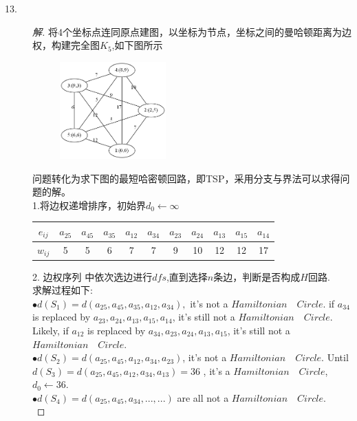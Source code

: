 \documentclass[UTF8, onecolumn, a4paper]{article}
\begin{document}
\begin{description}
\item[13.]
\begin{proof}[解]
将4个坐标点连同原点建图，以坐标为节点，坐标之间的曼哈顿距离为边权，构建完全图$K_5$,如下图所示\\
\begin{figure}[h]
	\centering
	\includegraphics[width=0.4\textwidth]{demo3.png}
\end{figure}
问题转化为求下图的最短哈密顿回路，即TSP，采用分支与界法可以求得问题的解。\\
1.将边权递增排序，初始界$d_0\leftarrow\infty$\\
\begin{center}
	\begin{tabular}{ccccccccccc}
		\hline
		$e_{ij}$ & $a_{25}$ & $a_{45}$ & $a_{35}$ &  $a_{12}$ & $a_{34}$ & $a_{23}$ & $a_{24}$ & $a_{13}$ & $a_{15}$ & $a_{14}$ \\
		\hline
		$w_{ij}$& 5 & 5 & 6 & 7 & 7 & 9 & 10 & 12 & 12 & 17\\
		\hline
	\end{tabular}
\end{center}
2. 边权序列 中依次选边进行$dfs$,直到选择$n$条边，判断是否构成$H$回路.
\\求解过程如下:\\
$\bullet$\quad$d(S_1) = d(a_{25}, a_{45}, a_{35}, a_{12}, a_{34}),$ it's not a $Hamiltonian\quad Circle$. if $a_{34}$ is replaced by $a_{23}, a_{24}, a_{13}, a_{15}, a_{14}$, it's still not a $Hamiltonian\quad Circle$. Likely, if $a_{12}$ is replaced by $a_{34} ,a_{23}, a_{24}, a_{13}, a_{15}$, it's still not a $Hamiltonian\quad Circle$.\\
$\bullet$\quad$ d(S_2) = d(a_{25}, a_{45}, a_{12}, a_{34}, a_{23})$, it's not a $Hamiltonian\quad Circle$. Until\\ $d(S_3) = d(a_{25}, a_{45}, a_{12}, a_{34}, a_{13}) = 36$ , it's a $Hamiltonian\quad Circle$, $d_0\leftarrow36$.\\
$\bullet$\quad$d(S_4) = d(a_{25}, a_{45}, a_{34}, ..., ...)$ are all not a  $Hamiltonian\quad Circle$.\\

\end{proof}
\end{description}
\end{document}

